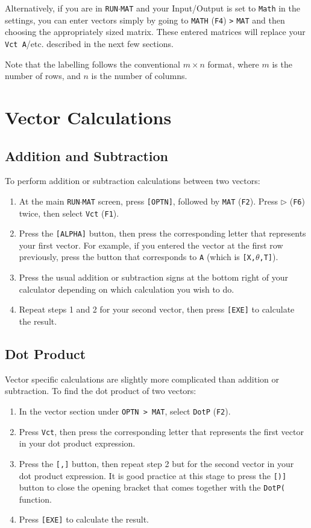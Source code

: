 \documentclass[a5paper]{memoir}
\def\code#1{\texttt{#1}}
\def\runmat{\code{RUN$\cdot$MAT} }
\def\Ffour{(\code{F4}) }
\def\Fsix{(\code{F6}) }
\def\fone{(\code{F1})}
\def\ftwo{(\code{F2})}
\begin{document}
Alternatively, if you are in \runmat and your Input/Output is set to \code{Math} in the settings, you can enter vectors simply by going to \code{MATH} \Ffour \code{>} \code{MAT} and then choosing the appropriately sized matrix. These entered matrices will replace your \code{Vct A}/etc. described in the next few sections.

Note that the labelling follows the conventional $m \times n$ format, where $m$ is the number of rows, and $n$ is the number of columns.

\section{Vector Calculations}

\subsection{Addition and Subtraction}

To perform addition or subtraction calculations between two vectors:

\begin{enumerate}
	\item At the main \runmat screen, press \code{[OPTN]}, followed by \code{MAT} \ftwo. Press \code{$\triangleright$} \Fsix twice, then select \code{Vct} \fone.
	\item Press the \code{[ALPHA]} button, then press the corresponding letter that represents your first vector. For example, if you entered the vector at the first row previously, press the button that corresponds to \code{A} (which is \code{[X,$\theta$,T]}).
	\item Press the usual addition or subtraction signs at the bottom right of your calculator depending on which calculation you wish to do.
	\item Repeat steps 1 and 2 for your second vector, then press \code{[EXE]} to calculate the result.
\end{enumerate}

\subsection{Dot Product}

Vector specific calculations are slightly more complicated than addition or subtraction. To find the dot product of two vectors:

\begin{enumerate}
	\item In the vector section under \code{OPTN > MAT}, select \code{DotP} \ftwo.
	\item Press \code{Vct}, then press the corresponding letter that represents the first vector in your dot product expression.
	\item Press the \code{[,]} button, then repeat step 2 but for the second vector in your dot product expression. It is good practice at this stage to press the \code{[)]} button to close the opening bracket that comes together with the \code{DotP(} function.
	\item Press \code{[EXE]} to calculate the result.
\end{enumerate}
\end{document}
